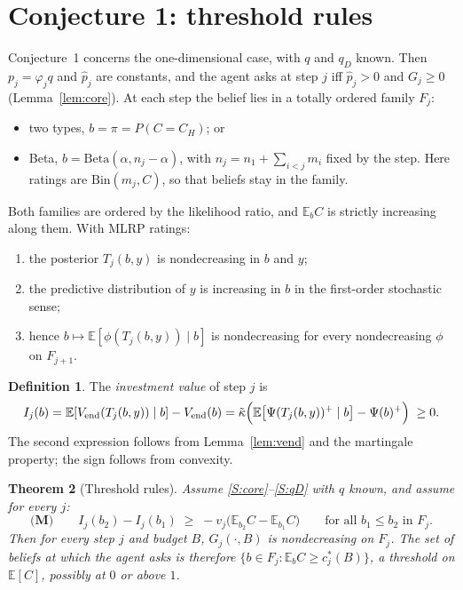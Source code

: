 \documentclass[11pt,a4paper]{article}
\newtheorem{theorem}{Theorem}
\theoremstyle{definition}
\newtheorem{definition}[theorem]{Definition}
\theoremstyle{remark}
\newcommand{\E}{\mathbb{E}}
\newcommand{\Vend}{V_{\mathrm{end}}}
\newcommand{\pp}{\hat p}
\newcommand{\kt}{\tilde\kappa}
\begin{document}
\section{Conjecture 1: threshold rules}\label{sec:c1}

Conjecture~1 concerns the one-dimensional case, with $q$ and $q_D$ known. Then $p_j=\varphi_jq$ and $\pp_j$ are constants, and the agent asks at step $j$ iff $\pp_j>0$ and $G_j\ge0$ (Lemma~\ref{lem:core}). At each step the belief lies in a totally ordered family $F_j$:
\begin{itemize}[nosep]
\item two types, $b=\pi=P(C=C_H)$; or
\item Beta, $b=\mathrm{Beta}(\alpha,n_j-\alpha)$, with $n_j=n_1+\sum_{i<j}m_i$ fixed by the step. Here ratings are $\mathrm{Bin}(m_j,C)$, so that beliefs stay in the family.
\end{itemize}
Both families are ordered by the likelihood ratio, and $\E_bC$ is strictly increasing along them. With MLRP ratings:
\begin{enumerate}[label=(\roman*),nosep]
\item the posterior $T_j(b,y)$ is nondecreasing in $b$ and $y$;
\item the predictive distribution of $y$ is increasing in $b$ in the first-order stochastic sense;
\item hence $b\mapsto\E[\phi(T_j(b,y))\mid b]$ is nondecreasing for every nondecreasing $\phi$ on $F_{j+1}$.
\end{enumerate}

\begin{definition}
The \emph{investment value} of step $j$ is
\[
I_j(b)=\E[\Vend(T_j(b,y))\mid b]-\Vend(b)=\kt\Bigl(\E\bigl[\Psi(T_j(b,y))^+\mid b\bigr]-\Psi(b)^+\Bigr)\;\ge0.
\]
The second expression follows from Lemma~\ref{lem:vend} and the martingale property; the sign follows from convexity.
\end{definition}

\begin{theorem}[Threshold rules]\label{thm:c1}
Assume \ref{S:core}--\ref{S:qD} with $q$ known, and assume for every $j$:
\begin{equation*}
\textbf{(M)}\qquad I_j(b_2)-I_j(b_1)\;\ge\;-v_j\bigl(\E_{b_2}C-\E_{b_1}C\bigr)\qquad\text{for all }b_1\le b_2\text{ in }F_j.
\end{equation*}
Then for every step $j$ and budget $B$, $G_j(\cdot,B)$ is nondecreasing on $F_j$. The set of beliefs at which the agent asks is therefore $\{b\in F_j:\E_bC\ge c_j^*(B)\}$, a threshold on $\E[C]$, possibly at $0$ or above $1$.
\end{theorem}
\end{document}
